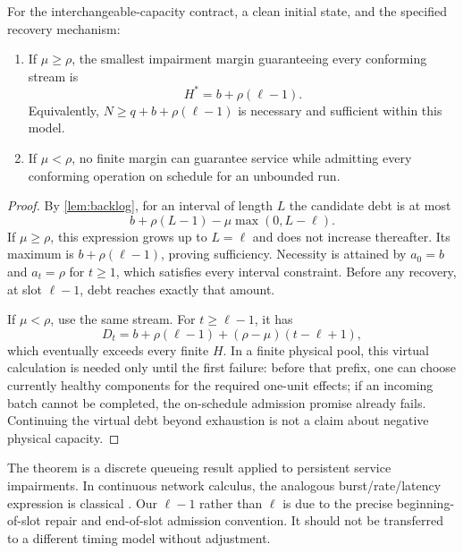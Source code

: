\begin{theorem}
\label{thm:margin}
For the interchangeable-capacity contract, a clean initial state, and the specified recovery mechanism:
\begin{enumerate}[label=(\roman*)]
\item If $\mu\ge\rho$, the smallest impairment margin guaranteeing every conforming stream is
\begin{equation}
 \boxed{H^*=b+\rho(\ell-1).}
 \label{eq:margin}
\end{equation}
Equivalently, $N\ge q+b+\rho(\ell-1)$ is necessary and sufficient within this model.
\item If $\mu<\rho$, no finite margin can guarantee service while admitting every conforming operation on schedule for an unbounded run.
\end{enumerate}
\end{theorem}
\begin{proof}
By \cref{lem:backlog}, for an interval of length $L$ the candidate debt is at most
\[
 b+\rho(L-1)-\mu\max(0,L-\ell).
\]
If $\mu\ge\rho$, this expression grows up to $L=\ell$ and does not increase thereafter. Its maximum is $b+\rho(\ell-1)$, proving sufficiency. Necessity is attained by $a_0=b$ and $a_t=\rho$ for $t\ge1$, which satisfies every interval constraint. Before any recovery, at slot $\ell-1$, debt reaches exactly that amount.

If $\mu<\rho$, use the same stream. For $t\ge\ell-1$, it has
\begin{equation}
 D_t=b+\rho(\ell-1)+(\rho-\mu)(t-\ell+1),
 \label{eq:growth}
\end{equation}
which eventually exceeds every finite $H$. In a finite physical pool, this virtual calculation is needed only until the first failure: before that prefix, one can choose currently healthy components for the required one-unit effects; if an incoming batch cannot be completed, the on-schedule admission promise already fails. Continuing the virtual debt beyond exhaustion is not a claim about negative physical capacity.
\end{proof}

The theorem is a discrete queueing result applied to persistent service impairments. In continuous network calculus, the analogous burst/rate/latency expression is classical \cite{netcal}. Our $\ell-1$ rather than $\ell$ is due to the precise beginning-of-slot repair and end-of-slot admission convention. It should not be transferred to a different timing model without adjustment.

